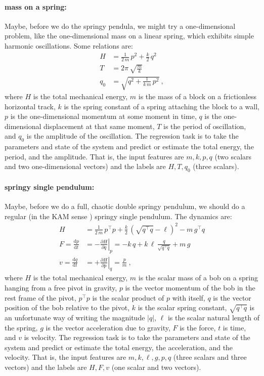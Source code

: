 \documentclass[12pt, letterpaper]{article}
\newcommand{\dd}{\mathrm{d}}
\begin{document}
\paragraph{mass on a spring:} Maybe, before we do the springy pendula, we might try a one-dimensional problem, like the one-dimensional mass on a linear spring, which exhibits simple harmonic oscillations. Some relations are:
\begin{align}
    H &= \frac{1}{2\,m}\,p^2 + \frac{k}{2}\,q^2 \\
    T &= 2\pi\,\sqrt{\frac{m}{k}} \\
    q_0 &= \sqrt{q^2 + \frac{1}{k\,m}\,p^2} ~,
\end{align}
where $H$ is the total mechanical energy, $m$ is the mass of a block on a frictionless horizontal track, $k$ is the spring constant of a spring attaching the block to a wall, $p$ is the one-dimensional momentum at some moment in time, $q$ is the one-dimensional displacement at that same moment, $T$ is the period of oscillation, and $q_0$ is the amplitude of the oscillation.
The regression task is to take the parameters and state of the system and predict or estimate the total energy, the period, and the amplitude.
That is, the input features are $m,k,p,q$ (two scalars and two one-dimensional vectors) and the labels are $H,T,q_0$ (three scalars).

\paragraph{springy single pendulum:} Maybe, before we do a full, chaotic double springy pendulum, we should do a regular (in the KAM sense \cite{kam}) springy single pendulum. The dynamics are:
\begin{align}
    H &= \frac{1}{2\,m}\,p^\top p + \frac{k}{2}\,(\sqrt{q^\top q} - \ell)^2 - m\,g^\top q \\
    F = \frac{\dd p}{\dd t} &= -\left.\frac{\partial H}{\partial q}\right|_p = -k\,q + k\,\ell\,\frac{q}{\sqrt{q^\top q}} + m\,g \\
    v = \frac{\dd q}{\dd t} &= +\left.\frac{\partial H}{\partial p}\right|_q = \frac{p}{m} ~,
\end{align}
where $H$ is the total mechanical energy, $m$ is the scalar mass of a bob on a spring hanging from a free pivot in gravity, $p$ is the vector momentum of the bob in the rest frame of the pivot, $p^\top p$ is the scalar product of $p$ with itself, $q$ is the vector position of the bob relative to the pivot, $k$ is the scalar spring constant, $\sqrt{q^\top q}$ is an unfortunate way of writing the magnitude $|q|$, $\ell$ is the scalar natural length of the spring, $g$ is the vector acceleration due to gravity, $F$ is the force, $t$ is time, and $v$ is velocity.
The regression task is to take the parameters and state of the system and predict or estimate the total energy, the acceleration, and the velocity.
That is, the input features are $m,k,\ell,g,p,q$ (three scalars and three vectors) and the labels are $H,F,v$ (one scalar and two vectors).
\end{document}
